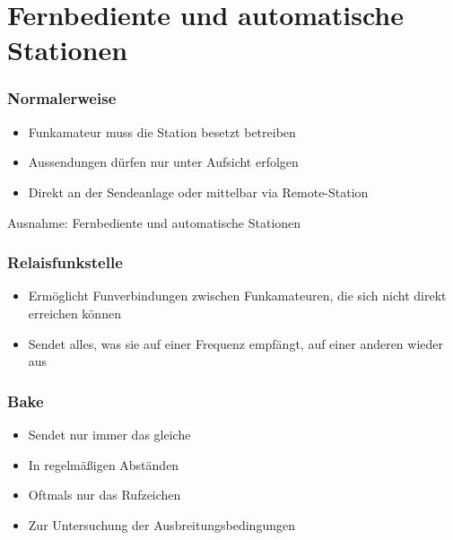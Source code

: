 
\section{Fernbediente und automatische Stationen}
\label{section:fernbediente_automatische_stationen}
\begin{frame}%

\frametitle{Normalerweise}
\begin{itemize}
  \item Funkamateur muss die Station besetzt betreiben
  \item Aussendungen dürfen nur unter Aufsicht erfolgen
  \item Direkt an der Sendeanlage oder mittelbar via Remote-Station
  \end{itemize}
    \pause
    Ausnahme: Fernbediente und automatische Stationen



\end{frame}

\begin{frame}
\frametitle{Relaisfunkstelle}
\begin{itemize}
  \item Ermöglicht Funverbindungen zwischen Funkamateuren, die sich nicht direkt erreichen können
  \item Sendet alles, was sie auf einer Frequenz empfängt, auf einer anderen wieder aus
  \end{itemize}

\end{frame}

\begin{frame}
\frametitle{Bake}
\begin{itemize}
  \item Sendet nur immer das gleiche
  \item In regelmäßigen Abständen
  \item Oftmals nur das Rufzeichen
  \item Zur Untersuchung der Ausbreitungsbedingungen
  \end{itemize}
\end{frame}

